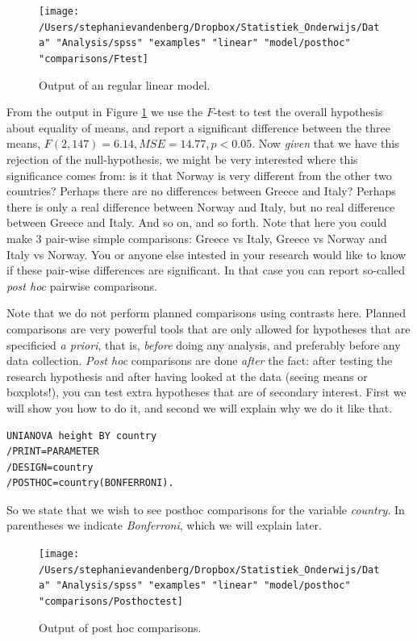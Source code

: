 \documentclass[]{book}\usepackage[]{graphicx}\usepackage[]{color}
\begin{document}
\begin{figure}[h]
    \begin{center}
       \texttt{[image: /Users/stephanievandenberg/Dropbox/Statistiek\_Onderwijs/Data" "Analysis/spss" "examples" "linear" "model/posthoc" "comparisons/Ftest]}
    \end{center}
    \caption{Output of an regular linear model.}
    \label{fig:Ftest}
\end{figure}


From the output in Figure \ref{fig:Ftest} we use the $F$-test to test the overall hypothesis about equality of means, and report a significant difference between the three means, $F(2, 147)=6.14 , MSE=14.77, p<0.05$. Now \textit{given} that we have this rejection of the null-hypothesis, we might be very interested where this significance comes from: is it that Norway is very different from the other two countries? Perhaps there are no differences between Greece and Italy? Perhaps there is only a real difference between Norway
and Italy, but no real difference between Greece and Italy. And so on, and so forth. Note that here you could make 3 pair-wise simple comparisons: Greece vs Italy, Greece vs Norway and Italy vs Norway. You or anyone else intested in your research would like to know if these pair-wise differences are significant. In that case you can report so-called \textit{post hoc} pairwise comparisons. 

Note that we do not perform planned comparisons using contrasts here. Planned comparisons are very powerful tools that are only allowed for hypotheses that are specificied \textit{a priori}, that is, \textit{before} doing any analysis, and preferably before any data collection. \textit{Post hoc} comparisons are done \textit{after} the fact: after testing the research hypothesis and after having looked at the data (seeing means or boxplots!), you can test extra hypotheses that are of secondary interest. First we will show you how to do it, and second we will explain why we do it like that. 

\begin{verbatim}
UNIANOVA height BY country
/PRINT=PARAMETER
/DESIGN=country
/POSTHOC=country(BONFERRONI).
\end{verbatim}

So we state that we wish to see posthoc comparisons for the variable \textit{country}. In parentheses we indicate \textit{Bonferroni}, which we will explain later.

\begin{figure}[h]
    \begin{center}
       \texttt{[image: /Users/stephanievandenberg/Dropbox/Statistiek\_Onderwijs/Data" "Analysis/spss" "examples" "linear" "model/posthoc" "comparisons/Posthoctest]}
    \end{center}
    \caption{Output of post hoc comparisons.}
        \label{fig:posthoctest}
\end{figure}
\end{document}
